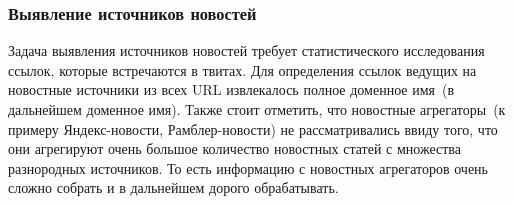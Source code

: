 %
%
%
%
%
%

    \subsubsection{Выявление источников новостей}
        Задача выявления источников новостей требует статистического исследования ссылок, которые встречаются в твитах.
        Для определения ссылок ведущих на новостные источники из всех URL извлекалось полное доменное имя~(в дальнейшем доменное имя).
        Также стоит отметить, что новостные агрегаторы~(к примеру Яндекс-новости, Рамблер-новости) не рассматривались ввиду того, что они агрегируют
        очень большое количество новостных статей с множества разнородных источников.
        То есть информацию с новостных агрегаторов очень сложно собрать и в дальнейшем дорого обрабатывать.

